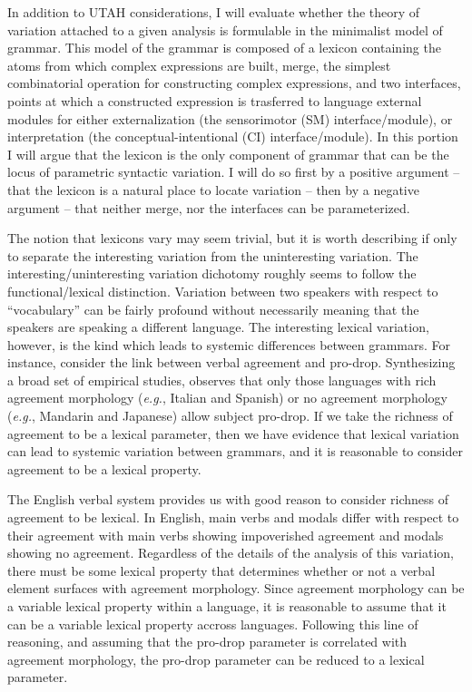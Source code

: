 \documentclass[MilwayThesis]{subfiles}
\begin{document}
In addition to UTAH considerations, I will evaluate whether the theory of variation attached to a given analysis is formulable in the minimalist model of grammar.
This model of the grammar is composed of a lexicon containing the atoms from which complex expressions are built, merge, the simplest combinatorial operation for constructing complex expressions, and two interfaces, points at which a constructed expression is trasferred to language external modules for either externalization (the sensorimotor (SM) interface/module), or interpretation (the conceptual-intentional (CI) interface/module).
In this portion I will argue that the lexicon is the only component of grammar that can be the locus of parametric syntactic variation.
I will do so first by a positive argument -- that the lexicon is a natural place to locate variation -- then by a negative argument -- that neither merge, nor the interfaces can be parameterized.

The notion that lexicons vary may seem trivial, but it is worth describing if only to separate the interesting variation from the uninteresting variation.
The interesting/uninteresting variation dichotomy roughly seems to follow the functional/lexical distinction.
Variation between two speakers with respect to ``vocabulary'' can be fairly profound without necessarily meaning that the speakers are speaking a different language.
The interesting lexical variation, however, is the kind which leads to systemic differences between grammars.
For instance, consider the link between verbal agreement and pro-drop.
Synthesizing a broad set of empirical studies, \textcite{huang1984distribution} observes that only those languages with rich agreement morphology (\textit{e.g.}, Italian and Spanish) or no agreement morphology (\textit{e.g.}, Mandarin and Japanese) allow subject pro-drop.
If we take the richness of agreement to be a lexical parameter, then we have evidence that lexical variation can lead to systemic variation between grammars, and it is reasonable to consider agreement to be a lexical property.

The English verbal system provides us with good reason to consider richness of agreement to be lexical.
In English, main verbs and modals differ with respect to their agreement with main verbs showing impoverished agreement and modals showing no agreement.
Regardless of the details of the analysis of this variation, there must be some lexical property that determines whether or not a verbal element surfaces with agreement morphology.
Since agreement morphology can be a variable lexical property within a language, it is reasonable to assume that it can be a variable lexical property accross languages.
Following this line of reasoning, and assuming that the pro-drop parameter is correlated with agreement morphology, the pro-drop parameter can be reduced to a lexical parameter.
\end{document}
